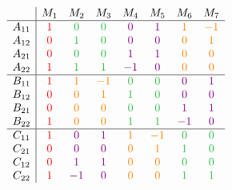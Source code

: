 \documentclass[MS]{wfuthesis}
\begin{document}
\begin{multicols}{2}
                        \columnbreak
                        
                        \[\begin{array}{c|ccccccc}
                                & M_1 & M_2 & M_3 & M_4 & M_5 & M_6 & M_7 \\
                                \hline
                                A_{11} & \color{red} 1 & \color{mycustomgreen} 0 & \color{mycustomgreen} 0 & \color{violet} 0 & \color{violet} 1 & \color{orange} 1 & \color{orange} -1 \\
                                A_{12} & \color{red} 0 & \color{mycustomgreen} 1 & \color{mycustomgreen} 0 & \color{violet} 0 & \color{violet} 0 & \color{orange} 0 & \color{orange} 1 \\
                                A_{21} & \color{red} 0 & \color{mycustomgreen} 0 & \color{mycustomgreen} 0 & \color{violet} 1 & \color{violet} 1 & \color{orange} 0 & \color{orange} 0 \\
                                A_{22} & \color{red} 1 & \color{mycustomgreen} 1 & \color{mycustomgreen} 1 & \color{violet} -1 & \color{violet} 0 & \color{orange} 0 & \color{orange} 0 \\
                                \hline
                                B_{11} & \color{red} 1 & \color{orange} 1 & \color{orange} -1 & \color{mycustomgreen} 0 & \color{mycustomgreen} 0 & \color{violet} 0 & \color{violet} 1 \\
                                B_{12} & \color{red} 0 & \color{orange} 0 & \color{orange} 1 & \color{mycustomgreen} 1 & \color{mycustomgreen} 0 & \color{violet} 0 & \color{violet} 0 \\
                                B_{21} & \color{red} 0 & \color{orange} 0 & \color{orange} 0 & \color{mycustomgreen} 0 & \color{mycustomgreen} 0 & \color{violet} 1 & \color{violet} 1 \\
                                B_{22} & \color{red} 1 & \color{orange} 0 & \color{orange} 0 & \color{mycustomgreen} 1 & \color{mycustomgreen} 1 & \color{violet} -1 & \color{violet} 0 \\
                                \hline
                                C_{11} & \color{red} 1 & \color{violet} 0 & \color{violet} 1 & \color{orange} 1 & \color{orange} -1 & \color{mycustomgreen} 0 & \color{mycustomgreen} 0 \\
                                C_{21} & \color{red} 0 & \color{violet} 0 & \color{violet} 0 & \color{orange} 0 & \color{orange} 1 & \color{mycustomgreen} 1 & \color{mycustomgreen} 0 \\
                                C_{12} & \color{red} 0 & \color{violet} 1 & \color{violet} 1 & \color{orange} 0 & \color{orange} 0 & \color{mycustomgreen} 0 & \color{mycustomgreen} 0 \\
                                C_{22} & \color{red} 1 & \color{violet} -1 & \color{violet} 0 & \color{orange} 0 & \color{orange} 0 & \color{mycustomgreen} 1 & \color{mycustomgreen} 1 \\
                        \end{array}\]
                        

\end{multicols}
\end{document}
